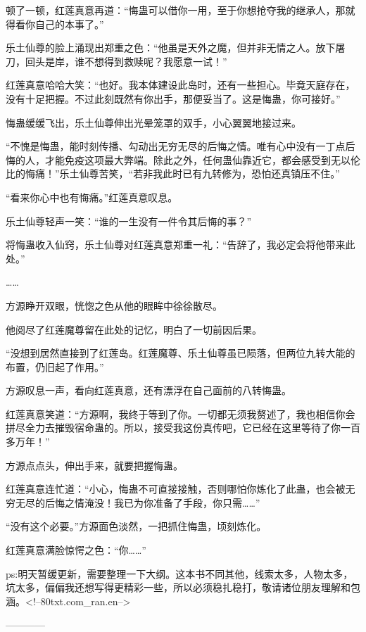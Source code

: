\begin{this_body}
顿了一顿，红莲真意再道：“悔蛊可以借你一用，至于你想抢夺我的继承人，那就得看你自己的本事了。”

乐土仙尊的脸上涌现出郑重之色：“他虽是天外之魔，但并非无情之人。放下屠刀，回头是岸，谁不想得到救赎呢？我愿意一试！”

红莲真意哈哈大笑：“也好。我本体建设此岛时，还有一些担心。毕竟天庭存在，没有十足把握。不过此刻既然有你出手，那便妥当了。这是悔蛊，你可接好。”

悔蛊缓缓飞出，乐土仙尊伸出光晕笼罩的双手，小心翼翼地接过来。

“不愧是悔蛊，能时刻传播、勾动出无穷无尽的后悔之情。唯有心中没有一丁点后悔的人，才能免疫这项最大弊端。除此之外，任何蛊仙靠近它，都会感受到无以伦比的悔痛！”乐土仙尊苦笑，“若非我此时已有九转修为，恐怕还真镇压不住。”

“看来你心中也有悔痛。”红莲真意叹息。

乐土仙尊轻声一笑：“谁的一生没有一件令其后悔的事？”

将悔蛊收入仙窍，乐土仙尊对红莲真意郑重一礼：“告辞了，我必定会将他带来此处。”

……

方源睁开双眼，恍惚之色从他的眼眸中徐徐散尽。

他阅尽了红莲魔尊留在此处的记忆，明白了一切前因后果。

“没想到居然直接到了红莲岛。红莲魔尊、乐土仙尊虽已陨落，但两位九转大能的布置，仍旧起了作用。”

方源叹息一声，看向红莲真意，还有漂浮在自己面前的八转悔蛊。

红莲真意笑道：“方源啊，我终于等到了你。一切都无须我赘述了，我也相信你会拼尽全力去摧毁宿命蛊的。所以，接受我这份真传吧，它已经在这里等待了你一百多万年！”

方源点点头，伸出手来，就要把握悔蛊。

红莲真意连忙道：“小心，悔蛊不可直接接触，否则哪怕你炼化了此蛊，也会被无穷无尽的后悔之情淹没！我已为你准备了手段，你只需……”

“没有这个必要。”方源面色淡然，一把抓住悔蛊，顷刻炼化。

红莲真意满脸惊愕之色：“你……”

ps:明天暂缓更新，需要整理一下大纲。这本书不同其他，线索太多，人物太多，坑太多，偏偏我还想写得更精彩一些，所以必须稳扎稳打，敬请诸位朋友理解和包涵。<!--80txt.com\_ran.en-->

------------

\end{this_body}

